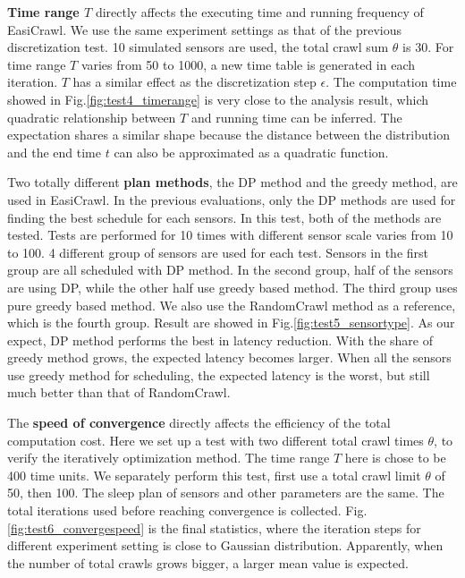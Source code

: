\documentclass[conference]{IEEEtran}
\begin{document}
\textbf{Time range $T$} directly affects the executing time and running frequency of EasiCrawl.
We use the same experiment settings as that of the previous discretization test. 
10 simulated sensors are used, the total crawl sum $\theta$ is 30. 
For time range $T$ varies from 50 to 1000, a new time table is generated in each iteration.
$T$ has a similar effect as the discretization step $\epsilon$. 
The computation time showed in Fig.\ref{fig:test4_timerange} is very close to the analysis result, which quadratic relationship between $T$ and running time can be inferred. 
The expectation shares a similar shape because the distance between the distribution and the end time $t$ can also be approximated as a quadratic function.

Two totally different \textbf{plan methods}, the DP method and the greedy method, are used in EasiCrawl.
In the previous evaluations, only the DP methods are used for finding the best schedule for each sensors. 
In this test, both of the methods are tested. 
Tests are performed for 10 times with different sensor scale varies from 10 to 100. 
4 different group of sensors are used for each test. 
Sensors in the first group are all scheduled with DP method.
In the second group, half of the sensors are using DP, while the other half use greedy based method. 
The third group uses pure greedy based method. 
We also use the RandomCrawl method as a reference, which is the fourth group.
Result are showed in Fig.\ref{fig:test5_sensortype}. 
As our expect, DP method performs the best in latency reduction. 
With the share of greedy method grows, the expected latency becomes larger. 
When all the sensors use greedy method for scheduling, the expected latency is the worst, but still much better than that of RandomCrawl.

The \textbf{speed of convergence} directly affects the efficiency of the total computation cost. 
Here we set up a test with two different total crawl times $\theta$, to verify the iteratively optimization method. 
The time range $T$ here is chose to be 400 time units. 
We separately perform this test, first use a total crawl limit $\theta$ of 50, then 100. 
The sleep plan of sensors and other parameters are the same. 
The total iterations used before reaching convergence is collected.
Fig.\ref{fig:test6_convergespeed} is the final statistics, where the iteration steps for different experiment setting is close to Gaussian distribution. 
Apparently, when the number of total crawls grows bigger, a larger mean value is expected.
\end{document}
